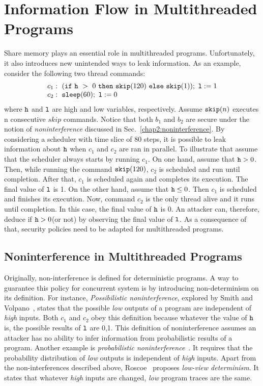 \documentclass{report}
\newcommand{\co}[1]{$\cod{#1}$}
\begin{document}
\section{Information Flow in Multithreaded Programs}
Share memory plays an essential role in multithreaded programs. 
Unfortunately, it also introduces new unintended ways to leak information.
As an example, consider the following two thread commands:
\begin{equation}
 \begin{array}{l}
c_1:~(\ifthenelse{\cod{h}~>~0}{\cod{skip}(120)}{\cod{skip}(1)});~\cod{l}:=1 \\ 
c_2:~\cod{sleep}(60);~\cod{l}:=0
 \end{array}
\label{chap2:example:multithread}
\end{equation}
where $\mathtt{h}$ and $\mathtt{l}$ are high and low variables,
respectively. 
Assume $\mathtt{skip}(n)$ executes n consecutive $skip$ commands.
Notice that both $b_1$ and $b_2$ are secure under the notion of {\em noninterference}
discussed in Sec.~\ref{chap2:noninterference}.
By considering a scheduler with time slice of 80 steps, it is possible
to leak information about \co{h} when $c_1$ and $c_2$ are ran in parallel.
To illustrate that assume that the scheduler always starts by running $c_1$.
On one hand, assume that $\mathtt{h}>0$. Then, while running the command
$\mathtt{skip}(120)$, $c_2$ is scheduled and run until completion. After that,
$c_1$ is scheduled again and completes its execution. The final value of \co{l}
is 1. On the other hand, assume that $\mathtt{h}\leq 0$. Then $c_1$ is scheduled
and finishes its execution. Now, command $c_2$ is the only thread alive and it
runs until completion. In this case, the final value of \co{h} is 0. 
An attacker can, therefore, deduce if $\mathtt{h}>0$(or not) by observing the final
value of \co{l}. As a consequence of that, security policies need to be adapted
for multithreaded programs.

\subsection{Noninterference in Multithreaded Programs}
\label{chap2:multithreaded:noninterference}
Originally, non-interference is defined for deterministic programs. 
A way to guarantee this policy for concurrent system is by introducing
non-determinism on its definition.
For instance, {\em Possibilistic noninterference}, explored by Smith and 
Volpano~\cite{Smith:Volpano:MultiThreaded}, states that the possible 
{\it low} outputs of a program are independent of {\it high} inputs. 
Both $c_1$ and $c_2$ obey this definition because whatever the value of 
$\mathtt{h}$ is, the possible results of $\mathtt{l}$ are 0,1. This definition of 
noninterference assumes an attacker has no ability to infer information
from probabilistic results of a program. Another example is 
{\em probabilistic noninterference}~\cite{Volpano:Smith:Probabilistic}. 
It requires that the probability distribution of {\it low} outputs
is independent of {\it high} inputs. Apart from the non-interferences described 
above, Roscoe~\cite{Roscoe:SSP95} proposes
{\em low-view determinism}. It states that whatever {\it high} inputs are changed,
{\it low} program traces are the same.
\end{document}
